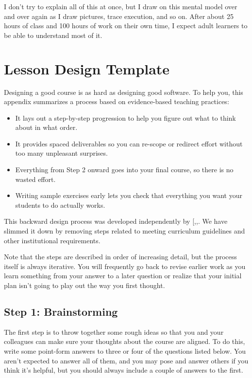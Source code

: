 I don't try to explain all of this at once, but I draw on this mental
model over and over again as I draw pictures, trace execution, and so
on. After about 25 hours of class and 100 hours of work on their own
time, I expect adult learners to be able to understand most of it.

\chapter{Lesson Design Template}\label{s:template}

Designing a good course is as hard as designing good software. To help
you, this appendix summarizes a process based on evidence-based teaching
practices:

\begin{itemize}
\item
  It lays out a step-by-step progression to help you figure out what
  to think about in what order.
\item
  It provides spaced deliverables so you can re-scope or redirect
  effort without too many unpleasant surprises.
\item
  Everything from Step 2 onward goes into your final course, so there
  is no wasted effort.
\item
  Writing sample exercises early lets you check that everything you
  want your students to do actually works.
\end{itemize}

This backward design process was developed independently by
{[},,\protect[\hyperlink{b:Fink2013}{Fink2013}]{]}. We have
slimmed it down by removing steps related to meeting curriculum
guidelines and other institutional requirements.

Note that the steps are described in order of increasing detail, but the
process itself is always iterative. You will frequently go back to
revise earlier work as you learn something from your answer to a later
question or realize that your initial plan isn't going to play out the
way you first thought.

\section{Step 1: Brainstorming}\label{step-1-brainstorming}

The first step is to throw together some rough ideas so that you and
your colleagues can make sure your thoughts about the course are
aligned. To do this, write some point-form answers to three or four of
the questions listed below. You aren't expected to answer all of them,
and you may pose and answer others if you think it's helpful, but you
should always include a couple of answers to the first.


